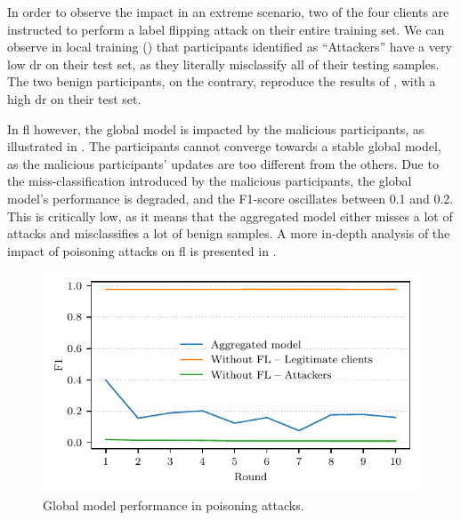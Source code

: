 In order to observe the impact in an extreme scenario, two of the four clients are instructed to perform a label flipping attack on their entire training set.
We can observe in local training () that participants identified as ``Attackers'' have a very low \gls{dr} on their test set, as they literally misclassify all of their testing samples.
The two benign participants, on the contrary, reproduce the results of , with a high \gls{dr} on their test set.

In \gls{fl} however, the global model is impacted by the malicious participants, as illustrated in .
The participants cannot converge towards a stable global model, as the malicious participants' updates are too different from the others.
Due to the miss-classification introduced by the malicious participants, the global model's performance is degraded, and the F1-score oscillates between 0.1 and 0.2.
This is critically low, as it means that the aggregated model either misses a lot of attacks and misclassifies a lot of benign samples.
A more in-depth analysis of the impact of poisoning attacks on \gls{fl} is presented in .

\begin{figure}
    \centering
    \includegraphics{figures/poisoning.pdf}
    \caption{Global model performance in poisoning attacks.}
    \label{fig:poisoning}
\end{figure}

\FloatBarrier